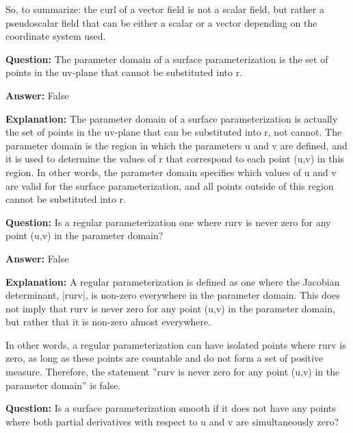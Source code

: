\documentclass{article}
\begin{document}
So, to summarize: the curl of a vector field is not a scalar field, but rather a pseudoscalar field that can be either a scalar or a vector depending on the coordinate system used.
                
                \vspace{0.5cm} 
        
            
                \textbf {Question:} The parameter domain of a surface parameterization is the set of points in the uv-plane that cannot be substituted into r.
                
                \textbf{Answer:} False

                \textbf{Explanation:} The parameter domain of a surface parameterization is actually the set of points in the uv-plane that can be substituted into r, not cannot. The parameter domain is the region in which the parameters u and v are defined, and it is used to determine the values of r that correspond to each point (u,v) in this region. In other words, the parameter domain specifies which values of u and v are valid for the surface parameterization, and all points outside of this region cannot be substituted into r.
                
                \vspace{0.5cm} 
        
            
                \textbf {Question:} Is a regular parameterization one where ru{\texttimes}rv is never zero for any point (u,v) in the parameter domain?
                
                \textbf{Answer:} False

                \textbf{Explanation:} A regular parameterization is defined as one where the Jacobian determinant, |ru{\texttimes}rv|, is non-zero everywhere in the parameter domain. This does not imply that ru{\texttimes}rv is never zero for any point (u,v) in the parameter domain, but rather that it is non-zero almost everywhere.

In other words, a regular parameterization can have isolated points where ru{\texttimes}rv is zero, as long as these points are countable and do not form a set of positive measure. Therefore, the statement ''ru{\texttimes}rv is never zero for any point (u,v) in the parameter domain'' is false.
                
                \vspace{0.5cm} 
        
            
                \textbf {Question:} Is a surface parameterization smooth if it does not have any points where both partial derivatives with respect to u and v are simultaneously zero?
                
\end{document}
